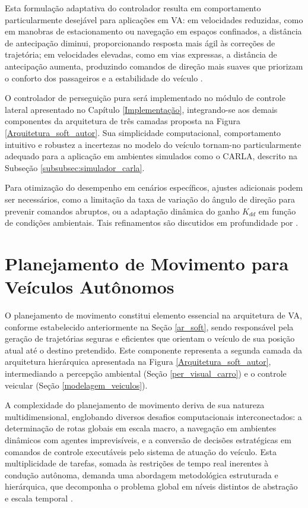Esta formulação adaptativa do controlador resulta em comportamento particularmente desejável para aplicações em VA: em velocidades reduzidas, como em manobras de estacionamento ou navegação em espaços confinados, a distância de antecipação diminui, proporcionando resposta mais ágil às correções de trajetória; em velocidades elevadas, como em vias expressas, a distância de antecipação aumenta, produzindo comandos de direção mais suaves que priorizam o conforto dos passageiros e a estabilidade do veículo \cite{University_of_Toronto2018-fe}.

O controlador de perseguição pura será implementado no módulo de controle lateral apresentado no Capítulo \ref{Implementação}, integrando-se aos demais componentes da arquitetura de três camadas proposta na Figura \ref{Arquitetura_soft_autor}. Sua simplicidade computacional, comportamento intuitivo e robustez a incertezas no modelo do veículo tornam-no particularmente adequado para a aplicação em ambientes simulados como o CARLA, descrito na Subseção \ref{subsubsec:simulador_carla}.

Para otimização do desempenho em cenários específicos, ajustes adicionais podem ser necessários, como a limitação da taxa de variação do ângulo de direção para prevenir comandos abruptos, ou a adaptação dinâmica do ganho $K_{dd}$ em função de condições ambientais. Tais refinamentos são discutidos em profundidade por .

\section{Planejamento de Movimento para Veículos Autônomos} \label{planejamento}

O planejamento de movimento constitui elemento essencial na arquitetura de VA, conforme estabelecido anteriormente na Seção \ref{ar_soft}, sendo responsável pela geração de trajetórias seguras e eficientes que orientam o veículo de sua posição atual até o destino pretendido. Este componente representa a segunda camada da arquitetura hierárquica apresentada na Figura \ref{Arquitetura_soft_autor}, intermediando a percepção ambiental (Seção \ref{per_visual_carro}) e o controle veicular (Seção \ref{modelagem_veiculos}).

A complexidade do planejamento de movimento deriva de sua natureza multidimensional, englobando diversos desafios computacionais interconectados: a determinação de rotas globais em escala macro, a navegação em ambientes dinâmicos com agentes imprevisíveis, e a conversão de decisões estratégicas em comandos de controle executáveis pelo sistema de atuação do veículo. Esta multiplicidade de tarefas, somada às restrições de tempo real inerentes à condução autônoma, demanda uma abordagem metodológica estruturada e hierárquica, que decomponha o problema global em níveis distintos de abstração e escala temporal \cite[Module 2 - Lesson 1: Driving Missions, Scenarios, and Behaviour]{University_of_Toronto2018-mp}.

